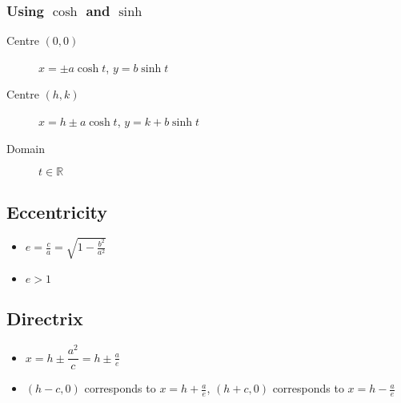 \subsubsection{Using $\cosh$ and $\sinh$}

\begin{description}
    \item[Centre $(0,0)$] $x=\pm a\cosh t$, $y=b\sinh t$
    \item[Centre $(h,k)$] $x=h\pm a\cosh t$, $y=k+b\sinh t$
    \item[Domain] $t \in \mathbb{R}$
\end{description}
\subsection{Eccentricity}
\begin{itemize}
    \item $e=\frac{c}{a}=\sqrt{1-\frac{b^2}{a^2}}$
    \item $e>1$
\end{itemize}
\subsection{Directrix}
\begin{itemize}
    \item $x=h\pm \dfrac{a^2}{c} = h\pm\frac{a}{e}$
    \item $(h-c, 0)$ corresponds to $x=h+\frac{a}{e}$, $(h+c, 0)$ corresponds to $x=h-\frac{a}{e}$
\end{itemize}